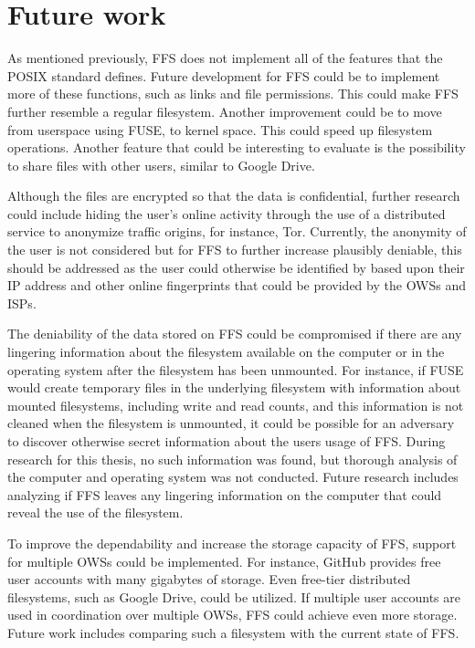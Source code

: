 
\section{Future work}
\label{sec:futureWork}
As mentioned previously, \gls{FFS} does not implement all of the features that the POSIX standard defines. Future development for \gls{FFS} could be to implement more of these functions, such as links and file permissions. This could make \gls{FFS} further resemble a regular filesystem. Another improvement could be to move from userspace using \gls{FUSE}, to kernel space. This could speed up filesystem operations. Another feature that could be interesting to evaluate is the possibility to share files with other users, similar to Google Drive.

Although the files are encrypted so that the data is confidential, further research could include hiding the user's online activity through the use of a distributed service to anonymize traffic origins, for instance, Tor. Currently, the anonymity of the user is not considered but for \gls{FFS} to further increase plausibly deniable, this should be addressed as the user could otherwise be identified by based upon their IP address and other online fingerprints that could be provided by the \glspl{OWS} and \glspl{ISP}.

The deniability of the data stored on \gls{FFS} could be compromised if there are any lingering information about the filesystem available on the computer or in the operating system after the filesystem has been unmounted. For instance, if \gls{FUSE} would create temporary files in the underlying filesystem with information about mounted filesystems, including write and read counts, and this information is not cleaned when the filesystem is unmounted, it could be possible for an adversary to discover otherwise secret information about the users usage of \gls{FFS}. During research for this thesis, no such information was found, but thorough analysis of the computer and operating system was not conducted. Future research includes analyzing if \gls{FFS} leaves any lingering information on the computer that could reveal the use of the filesystem.

To improve the dependability and increase the storage capacity of \gls{FFS}, support for multiple \glspl{OWS} could be implemented. For instance, GitHub provides free user accounts with many gigabytes of storage. Even \mbox{free-tier} distributed filesystems, such as Google Drive, could be utilized. If multiple user accounts are used in coordination over multiple \glspl{OWS}, \gls{FFS} could achieve even more storage. Future work includes comparing such a filesystem with the current state of \gls{FFS}.


